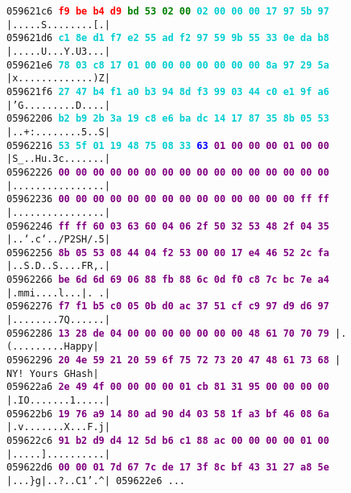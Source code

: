 \documentclass{article}
\begin{document}
\begin{figure}[H]
    \scriptsize{
    \texttt{059621c6  \textbf{\textcolor{red}{f9 be b4 d9} \textcolor{green}{bd 53 02 00}  \textcolor{darkTurquoise}{02 00 00 00 17 97 5b 97}}  |.....S........[.|} \\
    \texttt{059621d6  \textbf{\textcolor{darkTurquoise}{c1 8e d1 f7 e2 55 ad f2  97 59 9b 55 33 0e da b8}}  |.....U...Y.U3...|} \\
    \texttt{059621e6  \textbf{\textcolor{darkTurquoise}{78 03 c8 17 01 00 00 00  00 00 00 00 8a 97 29 5a}}  |x.............)Z|} \\
    \texttt{059621f6  \textbf{\textcolor{darkTurquoise}{27 47 b4 f1 a0 b3 94 8d  f3 99 03 44 c0 e1 9f a6}}  |'G.........D....|} \\
    \texttt{05962206  \textbf{\textcolor{darkTurquoise}{b2 b9 2b 3a 19 c8 e6 ba  dc 14 17 87 35 8b 05 53}}  |..+:........5..S|} \\
    \texttt{05962216  \textbf{\textcolor{darkTurquoise}{53 5f 01 19 48 75 08 33}  \textcolor{blue}{63} \textcolor{purple}{01 00 00 00 01 00 00}}  |S\_..Hu.3c.......|} \\
    \texttt{05962226 \textbf{\textcolor{purple}{00 00 00 00 00 00 00 00  00 00 00 00 00 00 00 00}} |................|} \\
    \texttt{05962236 \textbf{\textcolor{purple}{00 00 00 00 00 00 00 00  00 00 00 00 00 00 ff ff}} |................|} \\
    \texttt{05962246 \textbf{\textcolor{purple}{ff ff 60 03 63 60 04 06  2f 50 32 53 48 2f 04 35}} |..`.c`../P2SH/.5|} \\
    \texttt{05962256 \textbf{\textcolor{purple}{8b 05 53 08 44 04 f2 53  00 00 17 e4 46 52 2c fa}} |..S.D..S....FR,.|} \\
    \texttt{05962266 \textbf{\textcolor{purple}{be 6d 6d 69 06 88 fb 88  6c 0d f0 c8 7c bc 7e a4}} |.mmi....l...|.~.|} \\
    \texttt{05962276 \textbf{\textcolor{purple}{f7 f1 b5 c0 05 0b d0 ac  37 51 cf c9 97 d9 d6 97}} |........7Q......|} \\
    \texttt{05962286 \textbf{\textcolor{purple}{13 28 de 04 00 00 00 00  00 00 00 48 61 70 70 79}} |.(.........Happy|} \\
    \texttt{05962296 \textbf{\textcolor{purple}{20 4e 59 21 20 59 6f 75  72 73 20 47 48 61 73 68}} | NY! Yours GHash|} \\
    \texttt{059622a6 \textbf{\textcolor{purple}{2e 49 4f 00 00 00 00 01  cb 81 31 95 00 00 00 00}} |.IO.......1.....|} \\
    \texttt{059622b6 \textbf{\textcolor{purple}{19 76 a9 14 80 ad 90 d4  03 58 1f a3 bf 46 08 6a}} |.v.......X...F.j|} \\
    \texttt{059622c6 \textbf{\textcolor{purple}{91 b2 d9 d4 12 5d b6 c1  88 ac 00 00 00 00 01 00}} |.....]..........|} \\
    \texttt{059622d6 \textbf{\textcolor{purple}{00 00 01 7d 67 7c de 17  3f 8c bf 43 31 27 a8 5e}} |...\}g|..?..C1'.\textasciicircum|
    \texttt{059622e6} ...}
    }
    \end{figure}
\end{document}
